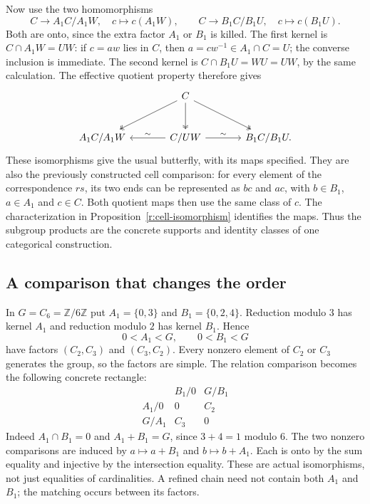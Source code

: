 \documentclass[11pt]{article}
\theoremstyle{definition}
\theoremstyle{remark}\newtheorem{remark}[theorem]{Remark}
\begin{document}
Now use the two homomorphisms
\[
 C\longrightarrow A_1C/A_1W,\quad c\longmapsto c(A_1W),
 \qquad
 C\longrightarrow B_1C/B_1U,\quad c\longmapsto c(B_1U).
\]
Both are onto, since the extra factor $A_1$ or $B_1$ is killed.
The first kernel is $C\cap A_1W=UW$: if $c=aw$ lies in $C$, then
$a=cw^{-1}\in A_1\cap C=U$; the converse inclusion is immediate.
The second kernel is $C\cap B_1U=WU=UW$, by the same calculation.
The effective quotient property therefore gives
\[
\begin{tikzcd}[column sep=large,row sep=large]
 &C\arrow[dl,two heads]\arrow[d,two heads]\arrow[dr,two heads]&\\
 A_1C/A_1W & C/UW\arrow[l,"\sim"']\arrow[r,"\sim"] & B_1C/B_1U .
\end{tikzcd}
\]
These isomorphisms give the usual butterfly, with its maps specified.
They are also the previously constructed cell comparison: for every
element of the correspondence $rs$, its two ends can be represented as
$bc$ and $ac$, with $b\in B_1$, $a\in A_1$ and $c\in C$.
Both quotient maps then use the same class of $c$. The characterization
in Proposition~\ref{r:cell-isomorphism} identifies the maps.
Thus the subgroup products are the concrete supports and identity
classes of one categorical construction.

\subsection{A comparison that changes the order}\label{e:cyclic-six}

In $G=C_6=\mathbb Z/6\mathbb Z$ put $A_1=\{0,3\}$ and
$B_1=\{0,2,4\}$. Reduction modulo $3$ has kernel $A_1$ and reduction
modulo $2$ has kernel $B_1$. Hence
\[
0<A_1<G,\qquad 0<B_1<G
\]
have factors $(C_2,C_3)$ and $(C_3,C_2)$. Every nonzero element of $C_2$
or $C_3$ generates the group, so the factors are simple.
The relation comparison becomes the following concrete rectangle:
\[
\begin{array}{c|cc}
 & B_1/0&G/B_1\\\hline
A_1/0&0&C_2\\
G/A_1&C_3&0
\end{array}
\]
Indeed $A_1\cap B_1=0$ and $A_1+B_1=G$, since $3+4=1$ modulo $6$.
The two nonzero comparisons are induced by $a\mapsto a+B_1$ and
$b\mapsto b+A_1$. Each is onto by the sum equality and injective by the
intersection equality. These are actual isomorphisms, not just equalities
of cardinalities. A refined chain need not contain both $A_1$ and $B_1$;
the matching occurs between its factors.
\end{document}
